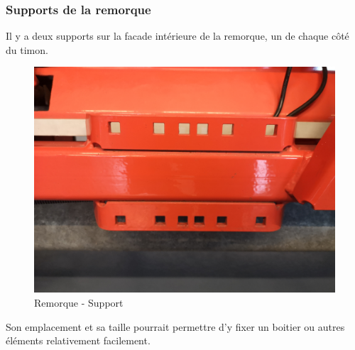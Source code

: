 \subsubsection{Supports de la remorque}
Il y a deux supports sur la facade intérieure de la remorque, un de chaque côté du timon.
\begin{figure}[H]
    \centering
    \includegraphics[width=13cm]{assets/figures/support.jpg}
    \caption{Remorque - Support}
\end{figure}

Son emplacement et sa taille pourrait permettre d'y fixer un boitier ou autres éléments relativement facilement.